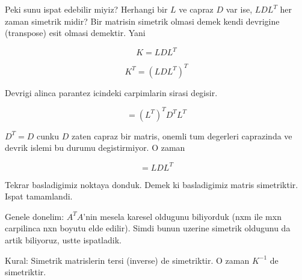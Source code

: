 \documentclass[12pt,fleqn]{article}
\begin{document}
Peki sunu ispat edebilir miyiz? Herhangi bir $L$ ve capraz $D$ var ise,
$LDL^T$ her zaman simetrik midir? Bir matrisin simetrik olmasi demek
kendi devrigine (transpose) esit olmasi demektir. Yani 

\[ K = LDL^T \]

\[ K^T = (LDL^T)^T \]

Devrigi alinca parantez icindeki carpimlarin sirasi degisir.

\[ = (L^T)^TD^TL^T \]

$D^T = D$ cunku $D$ zaten capraz bir matris, onemli tum degerleri
caprazinda ve devrik islemi bu durumu degistirmiyor. O zaman

\[ = LDL^T \]

Tekrar basladigimiz noktaya donduk. Demek ki basladigimiz matris
simetriktir. Ispat tamamlandi. 

Genele donelim: $A^TA$'nin mesela karesel oldugunu biliyorduk (nxm ile mxn
carpilinca nxn boyutu elde edilir). Simdi bunun uzerine simetrik oldugunu
da artik biliyoruz, ustte ispatladik.

Kural: Simetrik matrislerin tersi (inverse) de simetriktir. O zaman
$K^{-1}$ de simetriktir. 
\end{document}
